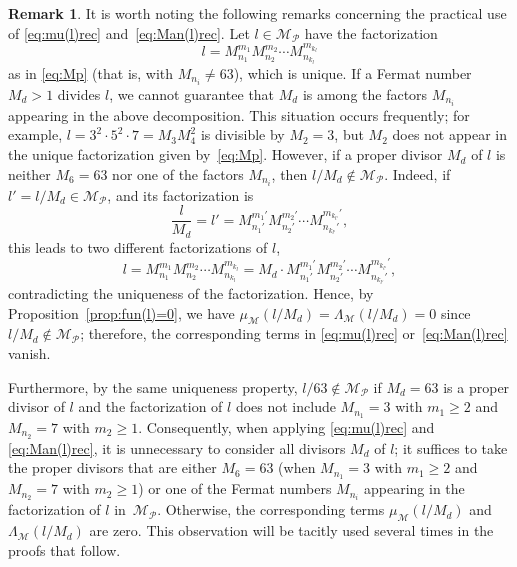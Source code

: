 \documentclass[11pt, a4paper]{article}
\newcommand{\calM}{\mathcal{M}}
\newcommand{\manM}{\Lambda_{\calM}}
\newcommand{\muM}{\mu_\calM}
\newcommand{\Mp}{\calM_{\mathcal{P}}}
\theoremstyle{plain}
\theoremstyle{definition}
\newtheorem{remark}[theorem]{Remark}
\begin{document}
\begin{remark}
\label{rem:nota}
It is worth noting the following remarks concerning the practical use of \eqref{eq:mu(l)rec} and~\eqref{eq:Man(l)rec}.
Let $l \in \Mp$ have the factorization
\[
  l = M_{n_1}^{m_1}M_{n_2}^{m_2} \cdots M_{n_{k_l}}^{m_{k_l}}
\]
as in \eqref{eq:Mp} (that is, with $M_{n_i} \ne 63$), which is unique.
If a Fermat number $M_d > 1$ divides $l$, we cannot guarantee that $M_d$ is among the factors $M_{n_i}$ appearing in the above decomposition. This situation occurs frequently; for example, $l = 3^2 \cdot 5^2 \cdot 7 = M_3 M_4^2$ is divisible by $M_2 = 3$, but $M_2$ does not appear in the unique factorization given by~\eqref{eq:Mp}.
However, if a proper divisor $M_d$ of $l$ is neither $M_6 = 63$ nor one of the factors $M_{n_i}$, then $l / M_d \notin \Mp$. Indeed, if $l' = l / M_d \in \Mp$, and its factorization is
\[
  \frac{l}{M_d} = l' = M_{n_1'}^{m_1'} M_{n_2'}^{m_2'} \cdots M_{n_{k_{l'}}'}^{m_{k_{l'}}'},
\]
this leads to two different factorizations of $l$,
\[
  l = M_{n_1}^{m_1}M_{n_2}^{m_2} \cdots M_{n_{k_l}}^{m_{k_l}}
  = M_d \cdot M_{n_1'}^{m_1'} M_{n_2'}^{m_2'} \cdots M_{n_{k_{l'}}'}^{m_{k_{l'}}'},
\]
contradicting the uniqueness of the factorization. Hence, by Proposition~\ref{prop:fun(l)=0}, we have $\muM(l/M_d) = \manM(l/M_d) = 0$ since $l / M_d \notin \Mp$; therefore, the corresponding terms in \eqref{eq:mu(l)rec} or~\eqref{eq:Man(l)rec} vanish.

Furthermore, by the same uniqueness property, $l/63 \notin \Mp$ if $M_d = 63$ is a proper divisor of $l$ and the factorization of $l$ does not include $M_{n_1} = 3$ with $m_1 \ge 2$ and $M_{n_2} = 7$ with $m_2 \ge 1$.
Consequently, when applying \eqref{eq:mu(l)rec} and \eqref{eq:Man(l)rec}, it is unnecessary to consider all divisors $M_d$ of $l$; it suffices to take the proper divisors that are either $M_6 = 63$ (when $M_{n_1} = 3$ with $m_1 \ge 2$ and $M_{n_2} = 7$ with $m_2 \ge 1$) or one of the Fermat numbers $M_{n_i}$ appearing in the factorization of $l$ in~$\Mp$.
Otherwise, the corresponding terms $\muM(l/M_d)$ and $\manM(l/M_d)$ are zero. This observation will be tacitly used several times in the proofs that follow.
\end{remark}

\end{document}
